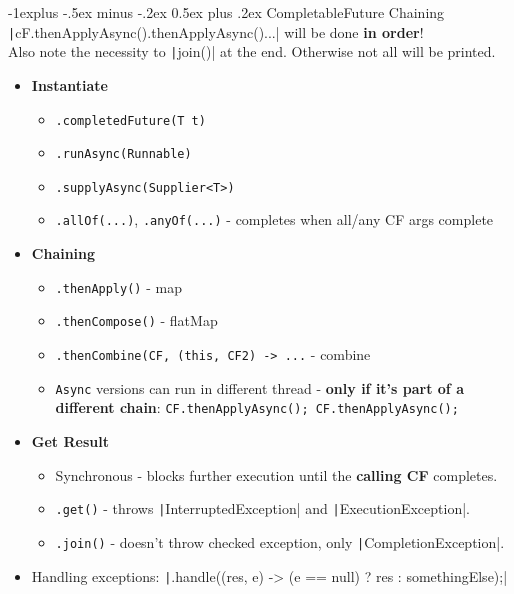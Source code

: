 \documentclass[10pt, landscape]{article}
\makeatletter
\renewcommand{\subsection}{\@startsection{subsection}{2}{0mm}%
                                {-1explus -.5ex minus -.2ex}%
                                {0.5ex plus .2ex}%
                                {\normalfont\normalsize\bfseries}}
\newcommand{\code}[1]{\textcolor{mygreen}{\texttt{#1}}}
\newcommand{\java}[1]{\texttt|#1|}
\makeatother
\begin{document}
\begin{multicols}{2}
\subsection{CompletableFuture}
Chaining \java{cF.thenApplyAsync().thenApplyAsync()...} will be done \textbf{in order}!
\\ Also note the necessity to \java{join()} at the end. Otherwise not all will be printed. 
\vspace{1 pt}
\begin{itemize}
    \item \textbf{Instantiate}
    \begin{itemize}
        \item \code{.completedFuture(T t)}
        \item \code{.runAsync(Runnable)}
        \item \code{.supplyAsync(Supplier<T>)}
        \item \code{.allOf(...)}, \code{.anyOf(...)} - completes when all/any CF args complete 
    \end{itemize}
    \item \textbf{Chaining}
    \begin{itemize}
        \item \code{.thenApply()} - map
        \item \code{.thenCompose()} - flatMap
        \item \code{.thenCombine(CF, (this, CF2) -> ...} - combine
        \item \code{Async} versions can run in different thread - \textbf{only if it's part of a different chain}: \code{CF.thenApplyAsync(); CF.thenApplyAsync(); }
    \end{itemize}
    \item \textbf{Get Result}
    \begin{itemize}
        \item Synchronous - blocks further execution until the \textbf{calling CF} completes.
        \item \code{.get()} - throws \java{InterruptedException} and \java{ExecutionException}.
        \item \code{.join()} - doesn't throw checked exception, only \java{CompletionException}.
    \end{itemize}
    \item Handling exceptions: \java{.handle((res, e) -> (e == null) ? res : somethingElse);}
    
\end{itemize}


\end{multicols}
\end{document}
